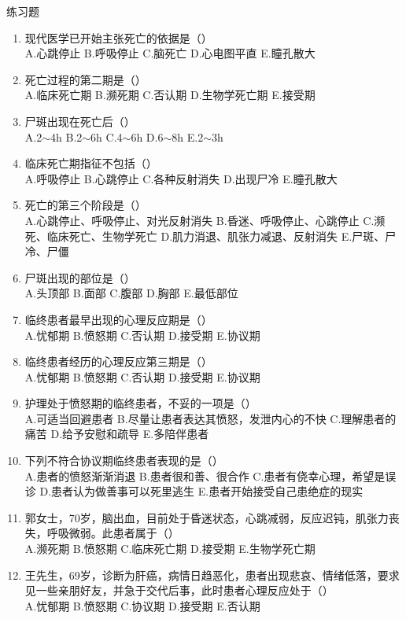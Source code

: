 \documentclass[11pt, a4paper]{ctexart}
\begin{document}
\begin{examplebox}{练习题}
	\begin{enumerate}
		\item 现代医学已开始主张死亡的依据是（\qquad）\\
		      A.心跳停止 \quad B.呼吸停止 \quad C.脑死亡 \quad D.心电图平直 \quad E.瞳孔散大
		\item 死亡过程的第二期是（\qquad）\\
		      A.临床死亡期 \quad B.濒死期 \quad C.否认期 \quad D.生物学死亡期 \quad E.接受期
		\item 尸斑出现在死亡后（\qquad）\\
		      A.2$\sim$4h \quad B.2$\sim$6h \quad C.4$\sim$6h \quad D.6$\sim$8h \quad E.2$\sim$3h
		\item 临床死亡期指征不包括（\qquad）\\
		      A.呼吸停止 \quad B.心跳停止 \quad C.各种反射消失 \quad D.出现尸冷 \quad E.瞳孔散大
		\item 死亡的第三个阶段是（\qquad）\\
		      A.心跳停止、呼吸停止、对光反射消失 \quad B.昏迷、呼吸停止、心跳停止 \quad C.濒死、临床死亡、生物学死亡 \quad D.肌力消退、肌张力减退、反射消失 \quad E.尸斑、尸冷、尸僵
		\item 尸斑出现的部位是（\qquad）\\
		      A.头顶部 \quad B.面部 \quad C.腹部 \quad D.胸部 \quad E.最低部位
		\item 临终患者最早出现的心理反应期是（\qquad）\\
		      A.忧郁期 \quad B.愤怒期 \quad C.否认期 \quad D.接受期 \quad E.协议期
		\item 临终患者经历的心理反应第三期是（\qquad）\\
		      A.忧郁期 \quad B.愤怒期 \quad C.否认期 \quad D.接受期 \quad E.协议期
		\item 护理处于愤怒期的临终患者，不妥的一项是（\qquad）\\
		      A.可适当回避患者 \quad B.尽量让患者表达其愤怒，发泄内心的不快 \quad C.理解患者的痛苦 \quad D.给予安慰和疏导 \quad E.多陪伴患者
		\item 下列不符合协议期临终患者表现的是（\qquad）\\
		      A.患者的愤怒渐渐消退 \quad B.患者很和善、很合作 \quad C.患者有侥幸心理，希望是误诊 \quad D.患者认为做善事可以死里逃生 \quad E.患者开始接受自己患绝症的现实
		\item 郭女士，70岁，脑出血，目前处于昏迷状态，心跳减弱，反应迟钝，肌张力丧失，呼吸微弱。此患者属于（\qquad）\\
		      A.濒死期 \quad B.愤怒期 \quad C.临床死亡期 \quad D.接受期 \quad E.生物学死亡期
		\item 王先生，69岁，诊断为肝癌，病情日趋恶化，患者出现悲哀、情绪低落，要求见一些亲朋好友，并急于交代后事，此时患者心理反应处于（\qquad）\\
		      A.忧郁期 \quad B.愤怒期 \quad C.协议期 \quad D.接受期 \quad E.否认期
	\end{enumerate}
\end{examplebox}
\end{document}
